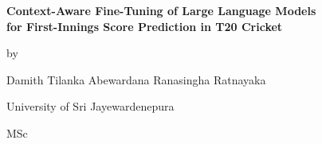 \clearpage
\thispagestyle{empty}

\begin{center}

\vspace*{2cm}

{\fontsize{24}{30}\selectfont\bfseries
Context-Aware Fine-Tuning of Large Language Models\\[0.4em]
for First-Innings Score Prediction in T20 Cricket\par}

\vspace{2.5cm}

{\large by}

\vspace{2cm}

{\fontsize{18}{24}\selectfont Damith Tilanka Abewardana Ranasingha Ratnayaka\par}

\vspace{1.5cm}

{\large University of Sri Jayewardenepura\par}

\end{center}

\vfill

\noindent
\begin{minipage}[b]{0.5\textwidth}
    {\large MSc}
\end{minipage}%
\begin{minipage}[b]{0.5\textwidth}
\end{minipage}

\clearpage

